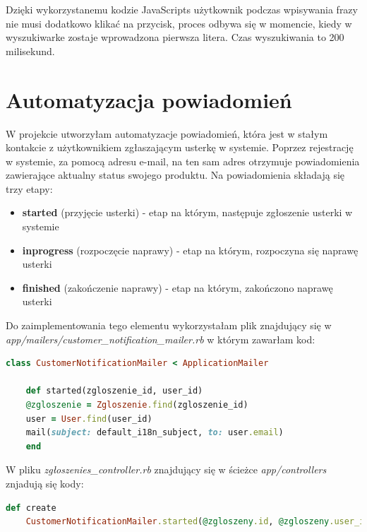 \documentclass[openright]{xmgr}
\begin{document}
	Dzięki wykorzystanemu kodzie JavaScripts użytkownik podczas wpisywania frazy nie musi dodatkowo klikać na przycisk, proces odbywa się w momencie, kiedy w wyszukiwarke zostaje wprowadzona pierwsza litera. Czas wyszukiwania to 200 milisekund. 
	\newpage
	\section{Automatyzacja powiadomień}
	
	W projekcie utworzyłam automatyzacje powiadomień, która jest w stałym kontakcie z użytkownikiem zgłaszającym usterkę w systemie. Poprzez rejestrację w systemie, za pomocą adresu e-mail, na ten sam adres otrzymuje powiadomienia zawierające aktualny status swojego produktu. Na powiadomienia składają się trzy etapy:
	
	\begin{itemize}
		\item
		\textbf{started} (przyjęcie usterki) - etap na którym, następuje zgłoszenie usterki w systemie
		
		\item
		\textbf{inprogress} (rozpoczęcie naprawy) - etap na którym, rozpoczyna się naprawę usterki
		
		\item
		\textbf{finished} (zakończenie naprawy) - etap na którym, zakończono naprawę usterki
	\end{itemize}
	
	Do zaimplementowania tego elementu wykorzystałam plik znajdujący się w \textit{app/mailers/customer\_notification\_mailer.rb} w którym zawarłam kod:
	
	\begin{lstlisting}[language=Ruby,lineskip={-1pt},caption=Opis statusów w modelu]
	class CustomerNotificationMailer < ApplicationMailer
	
	def started(zgloszenie_id, user_id)
	@zgloszenie = Zgloszenie.find(zgloszenie_id)
	user = User.find(user_id)
	mail(subject: default_i18n_subject, to: user.email) 
	end
	\end{lstlisting} 
	
	W pliku \textit{zgłoszenies\_controller.rb} znajdujący się w ścieżce
	\textit{app/controllers} znjadują się kody:
	
	\begin{lstlisting}[language=Ruby,lineskip={-1pt},caption=Powiadomienia o przyjęciu usterki do naprawy]
	def create
	CustomerNotificationMailer.started(@zgloszeny.id, @zgloszeny.user_id).deliver_later
	\end{lstlisting}
	
\end{document}
